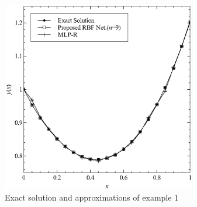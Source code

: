 \documentclass{mc}
\begin{document}
\begin{figure}
\centering
\includegraphics[width=8.5cm]{Fig2.eps}
\caption{Exact solution and approximations of example 1}
\label{fig2}
\end{figure}
\end{document}
